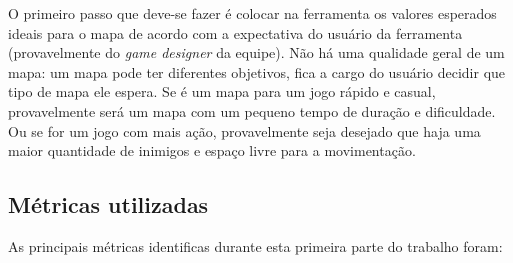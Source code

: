 O primeiro passo que deve-se fazer é colocar na ferramenta os valores esperados ideais para o mapa de acordo com a expectativa do usuário da ferramenta (provavelmente do \textit{game designer} da equipe). Não há uma qualidade geral de um mapa: um mapa pode ter diferentes objetivos, fica a cargo do usuário decidir que tipo de mapa ele espera. Se é um mapa para um jogo rápido e casual, provavelmente será um mapa com um pequeno tempo de duração e dificuldade. Ou se for um jogo com mais ação, provavelmente seja desejado que haja uma maior quantidade de inimigos e espaço livre para a movimentação.

\subsection{Métricas utilizadas}

As principais métricas identificas durante esta primeira parte do trabalho foram: 


